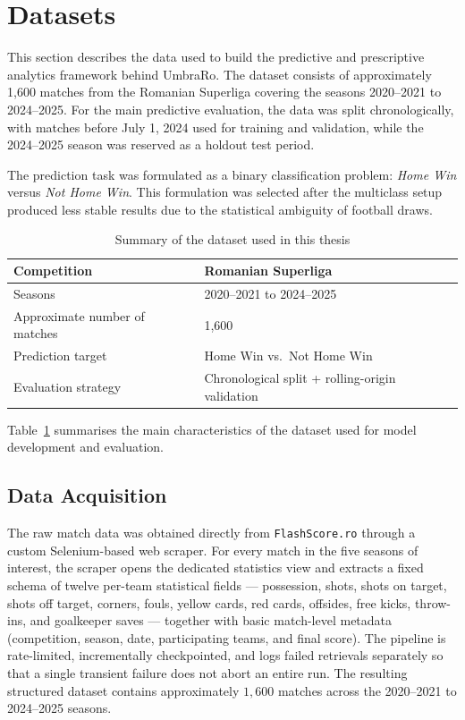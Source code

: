 \section{Datasets}
\label{sec:datasets}

This section describes the data used to build the predictive and prescriptive analytics framework behind UmbraRo. The dataset consists of approximately 1{,}600 matches from the Romanian Superliga covering the seasons 2020--2021 to 2024--2025. For the main predictive evaluation, the data was split chronologically, with matches before July 1, 2024 used for training and validation, while the 2024--2025 season was reserved as a holdout test period.

The prediction task was formulated as a binary classification problem: \emph{Home Win} versus \emph{Not Home Win}. This formulation was selected after the multiclass setup produced less stable results due to the statistical ambiguity of football draws.

\begin{table}[htbp]
\centering
\caption{Summary of the dataset used in this thesis}
\label{tab:dataset_summary}
\begin{tabular}{|l|l|}
\hline
Competition & Romanian Superliga \\
\hline
Seasons & 2020--2021 to 2024--2025 \\
\hline
Approximate number of matches & 1{,}600 \\
\hline
Prediction target & Home Win vs.\ Not Home Win \\
\hline
Evaluation strategy & Chronological split + rolling-origin validation \\
\hline
\end{tabular}
\end{table}

Table~\ref{tab:dataset_summary} summarises the main characteristics of the dataset used for model development and evaluation.

\subsection{Data Acquisition}
\label{subsec:data_acquisition}

The raw match data was obtained directly from \texttt{FlashScore.ro} through a custom Selenium-based web scraper. For every match in the five seasons of interest, the scraper opens the dedicated statistics view and extracts a fixed schema of twelve per-team statistical fields --- possession, shots, shots on target, shots off target, corners, fouls, yellow cards, red cards, offsides, free kicks, throw-ins, and goalkeeper saves --- together with basic match-level metadata (competition, season, date, participating teams, and final score). The pipeline is rate-limited, incrementally checkpointed, and logs failed retrievals separately so that a single transient failure does not abort an entire run. The resulting structured dataset contains approximately $1{,}600$ matches across the 2020--2021 to 2024--2025 seasons.

